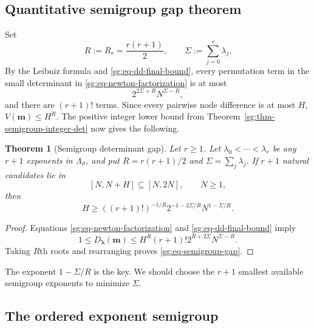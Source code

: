 \documentclass[11pt,oneside]{article}
\newtheorem{theorem}{Theorem}[section]
\theoremstyle{definition}
\theoremstyle{remark}
\newcommand{\thetaq}{\vartheta}
\newcommand{\LambdaTheta}{\Lambda_{\thetaq}}
\begin{document}
\subsection{Quantitative semigroup gap theorem}

Set
\[
 R:=R_r=\frac{r(r+1)}2,
 \qquad
 \Sigma:=\sum_{j=0}^{r}\lambda_j.
\]
By the Leibniz formula and \eqref{sg:eq-dd-final-bound}, every permutation term in the small
determinant in \eqref{sg:eq-newton-factorization} is at most
\[
 2^{2\Sigma+R}N^{\Sigma-R},
\]
and there are $(r+1)!$ terms.  Since every pairwise node difference is at most $H$,
$V(\boldsymbol m)\le H^R$.  The positive integer lower bound from
Theorem~\ref{sg:thm-semigroup-integer-det} now gives the following.

\begin{theorem}[Semigroup determinant gap]
\label{sg:thm-semigroup-gap}
Let $r\ge1$.  Let $\lambda_0<\cdots<\lambda_r$ be any $r+1$ exponents in
$\LambdaTheta$, and put $R=r(r+1)/2$ and $\Sigma=\sum_j\lambda_j$.  If $r+1$ natural
candidates lie in
\[
 [N,N+H]\subseteq[N,2N],
 \qquad N\ge1,
\]
then
\begin{equation}
 H\ge
 ((r+1)!)^{-1/R}
 2^{-1-2\Sigma/R}
 N^{1-\Sigma/R}.
 \label{sg:eq-semigroup-gap}
\end{equation}
\end{theorem}

\begin{proof}
Equations \eqref{sg:eq-newton-factorization} and \eqref{sg:eq-dd-final-bound} imply
\[
 1\le D_{\boldsymbol\lambda}(\boldsymbol m)
 \le
 H^R(r+1)!2^{R+2\Sigma}N^{\Sigma-R}.
\]
Taking $R$th roots and rearranging proves \eqref{sg:eq-semigroup-gap}.
\end{proof}

The exponent $1-\Sigma/R$ is the key.  We should choose the $r+1$ smallest available
semigroup exponents to minimize $\Sigma$.

\subsection{The ordered exponent semigroup}
\end{document}
